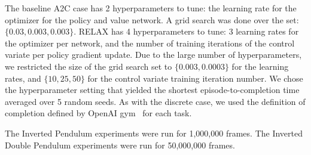 \documentclass{article}
\newcommand{\RELAX}{{\textnormal{RELAX}}}
\begin{document}
The baseline A2C case has 2 hyperparameters to tune: the learning rate for the optimizer for the policy and value network.
A grid search was done over the set: $\{0.03, 0.003, 0.003\}$.
\RELAX{} has 4 hyperparameters to tune: 3 learning rates for the optimizer per network, and the number of training iterations of the control variate per policy gradient update.
Due to the large number of hyperparameters, we restricted the size of the grid search set to $\{0.003, 0.0003\}$ for the learning rates, and $\{10, 25, 50\}$ for the control variate training iteration number.
We chose the hyperparameter setting that yielded the shortest episode-to-completion time averaged over 5 random seeds.
As with the discrete case, we used the definition of completion defined by OpenAI gym~\citep{1606.01540} for each task. 

The Inverted Pendulum experiments were run for 1,000,000 frames.
The Inverted Double Pendulum experiments were run for 50,000,000 frames.
\end{document}
